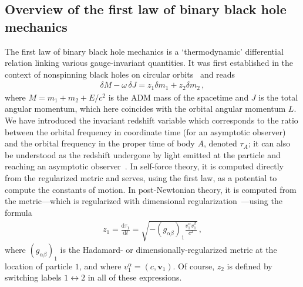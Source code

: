 \documentclass[prd,superscriptaddress,preprintnumbers,tightenlines,nofootinbib, eqsecnum]{revtex4-2}
\renewcommand{\dd}{\mathrm{d}}
\begin{document}
\subsection{Overview of the first law of binary black hole mechanics}
\label{subsec:first_law}

The first law of binary black hole mechanics is a `thermodynamic' differential relation linking various gauge-invariant quantities. It was first established in the context of nonspinning black holes on circular orbits~\cite{LeTiec:2011ab} and reads
\begin{align}
    \delta M - \omega\, \delta J = z_1 \delta m_1 + z_2 \delta m_2 \,,
\end{align}
where $M=m_1+m_2+E/c^2$ is the ADM mass of the spacetime and $J$ is the total angular momentum, which here coincides with the orbital angular momentum $L$. We have introduced the invariant redshift variable which corresponds to the ratio between the orbital frequency in coordinate time (for an asymptotic observer) and the orbital frequency in the proper time of body $A$, denoted $\tau_A$; it can also be understood as the redshift undergone by light emitted at the particle and reaching an asymptotic observer~\cite{Detweiler:2008ft}. In self-force theory, it is computed directly from the regularized metric and serves, using the first law, as a potential to compute the constants of motion. In post-Newtonian theory, it is computed from the metric---which is regularized with dimensional regularization~\cite{Blanchet:2009sd}---using the formula
\begin{align}
    z_1 = \frac{\dd \tau_1}{\dd t}=\sqrt{-(g_{\alpha\beta})_1 \frac{v_1^\alpha v_1^\beta}{c^2}} \,,
\end{align}
where $(g_{\alpha\beta})_1$ is the Hadamard- or dimensionally-regularized metric at the location of particle $1$, and where $v_1^\alpha=(c,\bm{v}_1)$. Of course, $z_2$ is defined by switching labels $1 \leftrightarrow 2$ in all of these expressions.
\end{document}
